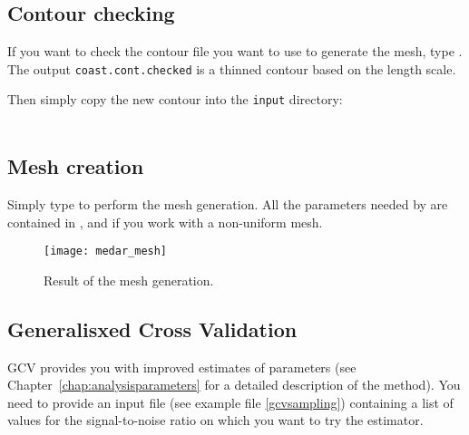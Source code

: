 \subsection{Contour checking}

If you want to check the contour file you want to use to generate the mesh, type . The output \texttt{coast.cont.checked} is a thinned contour based on the length scale.


Then simply copy the new contour into the \texttt{input} directory:\\
\\


\subsection{Mesh creation}

Simply type  to perform the mesh generation. All the parameters needed by \diva are contained in ,  and  if you work with a non-uniform mesh.
%
%


\begin{figure}[htpb]
\centering
\parbox{.65\textwidth}{
\texttt{[image: medar\_mesh]}
}\parbox{.35\textwidth}{
\caption{Result of the mesh generation.\label{divameshCL2}}
}
\end{figure}


\subsection{Generalisxed Cross Validation}

GCV provides you with improved estimates of parameters (see Chapter~\ref{chap:analysisparameters} for a detailed description of the method). You need to provide an input file  (see example file \ref{gcvsampling}) containing a list of values for the signal-to-noise ratio on which you want to try the estimator.

